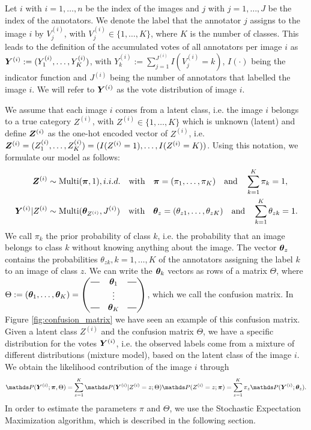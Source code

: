 Let $i$ with $i = 1, \ldots, n$ be the index of the images and $j$ with $j = 1,
\ldots, J$ be the index of the annotators. We denote the label that the
annotator $j$ assigns to the image $i$ by $V^{(i)}_j$, with $V^{(i)}_j \in \{1,
\ldots, K\}$, where $K$ is the number of classes. This leads to the definition
of the accumulated votes of all annotators per image $i$ as $\bm{Y}^{(i)} :=
(Y_1^{(i)}, \ldots, Y_K^{(i)})$, with $Y_k^{(i)} := \sum_{j=1}^{J^{(i)}}
I(V^{(i)}_j = k)$, $I(\cdot)$ being the indicator function and $J^{(i)}$ being
the number of annotators that labelled the image $i$. We will refer to
$\bm{Y}^{(i)}$ as the vote distribution of image $i$.\bigskip

We assume that each image $i$ comes from a latent class, i.e. the image $i$
belongs to a true category $Z^{(i)}$, with $Z^{(i)} \in \{1, \ldots, K\}$ which
is unknown (latent) and define $\bm{Z}^{(i)}$ as the one-hot encoded vector of
$Z^{(i)}$, i.e. $\bm{Z}^{(i)} = (Z_1^{(i)}, \dots, Z_K^{(i)}) = (I(Z^{(i)} = 1), \ldots, I(Z^{(i)} = K))$. Using
this notation, we formulate our model as follows:
\begin{align}
    \bm{Z}^{(i)} &\sim \text{Multi}(\bm{\pi}, 1), i.i.d. \quad \text{with} \quad \bm{\pi} = (\pi_1, \ldots, \pi_K) \quad \text{and} \quad \sum_{k=1}^K \pi_k = 1, \label{eq:1} \\
    \bm{Y}^{(i)} | Z^{(i)} &\sim \text{Multi}(\bm{\theta}_{Z^{(i)}}, J^{(i)}) \quad \text{with} \quad \bm{\theta}_z = (\theta_{z1}, \ldots, \theta_{zK}) \quad \text{and} \quad \sum_{k=1}^K \theta_{zk} = 1. \label{eq:2}
\end{align}
We call $\pi_k$ the prior probability of class $k$, i.e. the probability that an
image belongs to class $k$ without knowing anything about the image. The vector
$\bm{\theta}_z$ contains the probabilities $\theta_{zk}, k = 1,\dots,K$ of the
annotators assigning the label $k$ to an image of class $z$. We can write the
$\bm{\theta}_k$ vectors as rows of a matrix $\Theta$, where $\Theta := (\btheta_1,
\ldots, \btheta_K) = 
\begin{pmatrix}
    \horzbar & \btheta_1 & \horzbar \\
             & \vdots    &          \\
    \horzbar & \btheta_K & \horzbar \end{pmatrix}$, which we call the confusion
matrix. In Figure \ref{fig:confusion_matrix} we have seen an example of this
confusion matrix. Given a latent class $Z^{(i)}$ and the confusion matrix
$\Theta$, we have a specific distribution for the votes $\bm{Y}^{(i)}$, i.e. the
observed labels come from a mixture of different distributions (mixture model),
based on the latent class of the image $i$. We obtain the likelihood contribution of
the image $i$ through
\begin{equation}
    \P(\bY^{(i)}; \bpi, \Theta) = \sum_{z=1}^K \P(\bY^{(i)} | Z^{(i)} = z; \Theta) \P(Z^{(i)} = z; \bpi) = \sum_{z=1}^K \pi_z \P(\bY^{(i)}; \btheta_z).
\end{equation}
In order to estimate the parameters $\pi$ and $\Theta$, we use the Stochastic
Expectation Maximization algorithm, which is described in the following section.

